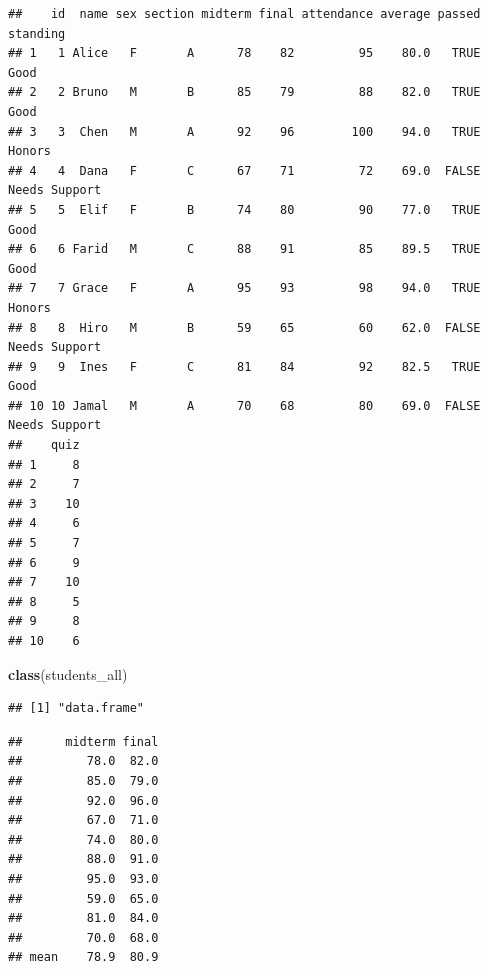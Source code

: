 \documentclass[
]{article}
\newenvironment{Shaded}{\begin{snugshade}}{\end{snugshade}}
\newcommand{\AttributeTok}[1]{\textcolor[rgb]{0.13,0.29,0.53}{#1}}
\newcommand{\CommentTok}[1]{\textcolor[rgb]{0.56,0.35,0.01}{\textit{#1}}}
\newcommand{\FunctionTok}[1]{\textcolor[rgb]{0.13,0.29,0.53}{\textbf{#1}}}
\newcommand{\NormalTok}[1]{#1}
\newcommand{\OtherTok}[1]{\textcolor[rgb]{0.56,0.35,0.01}{#1}}
\newcommand{\SpecialCharTok}[1]{\textcolor[rgb]{0.81,0.36,0.00}{\textbf{#1}}}
\begin{document}
\begin{verbatim}
##    id  name sex section midterm final attendance average passed      standing
## 1   1 Alice   F       A      78    82         95    80.0   TRUE          Good
## 2   2 Bruno   M       B      85    79         88    82.0   TRUE          Good
## 3   3  Chen   M       A      92    96        100    94.0   TRUE        Honors
## 4   4  Dana   F       C      67    71         72    69.0  FALSE Needs Support
## 5   5  Elif   F       B      74    80         90    77.0   TRUE          Good
## 6   6 Farid   M       C      88    91         85    89.5   TRUE          Good
## 7   7 Grace   F       A      95    93         98    94.0   TRUE        Honors
## 8   8  Hiro   M       B      59    65         60    62.0  FALSE Needs Support
## 9   9  Ines   F       C      81    84         92    82.5   TRUE          Good
## 10 10 Jamal   M       A      70    68         80    69.0  FALSE Needs Support
##    quiz
## 1     8
## 2     7
## 3    10
## 4     6
## 5     7
## 6     9
## 7    10
## 8     5
## 9     8
## 10    6
\end{verbatim}

\begin{Shaded}
\begin{Highlighting}[]
\FunctionTok{class}\NormalTok{(students\_all)}
\end{Highlighting}
\end{Shaded}

\begin{verbatim}
## [1] "data.frame"
\end{verbatim}

\begin{Shaded}
\end{Shaded}

\begin{verbatim}
##      midterm final
##         78.0  82.0
##         85.0  79.0
##         92.0  96.0
##         67.0  71.0
##         74.0  80.0
##         88.0  91.0
##         95.0  93.0
##         59.0  65.0
##         81.0  84.0
##         70.0  68.0
## mean    78.9  80.9
\end{verbatim}
\end{document}
